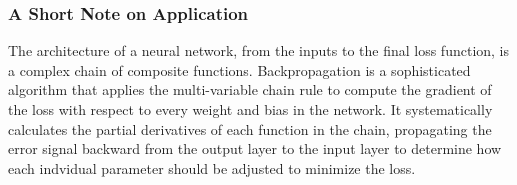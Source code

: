\documentclass{article}
\theoremstyle{plain}
\theoremstyle{definition}
\theoremstyle{remark}
\begin{document}
  \subsubsection{A Short Note on Application}
  \noindent The architecture of a neural network, from the inputs to the
final loss function, is a complex chain of composite functions.
Backpropagation is a sophisticated algorithm that applies the multi-variable
chain rule to compute the gradient of the loss with respect to every weight
and bias in the network. It systematically calculates the partial
derivatives of each function in the chain, propagating the error signal
backward from the output layer to the input layer to determine how each
indvidual parameter should be adjusted to minimize the loss.
\end{document}
